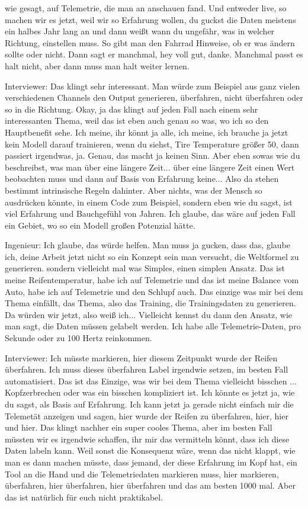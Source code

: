 wie gesagt, auf Telemetrie, die man an anschauen fand. Und entweder live, so machen wir es jetzt, weil wir so Erfahrung wollen, du guckst die Daten meistens ein halbes Jahr lang an und dann weißt wann du ungefähr, was in welcher Richtung, einstellen muss.   So gibt man den Fahrrad Hinweise, ob er was ändern sollte oder nicht. Dann sagt er manchmal, hey voll gut, danke.  Manchmal passt es halt nicht, aber dann muss man halt weiter lernen.

Interviewer: 
Das klingt sehr interessant. Man würde zum Beispiel aus ganz vielen verschiedenen Channels den Output generieren, überfahren, nicht überfahren oder so in die Richtung.  Okay, ja das klingt auf jeden Fall nach einem sehr interessanten Thema, weil das ist eben auch genau so was, wo ich so den Hauptbenefit sehe. Ich meine, ihr könnt ja alle, ich meine, ich brauche ja jetzt kein Modell darauf trainieren, wenn du siehst, Tire Temperature größer 50,  dann passiert irgendwas, ja. Genau,  das macht ja keinen Sinn. Aber eben sowas wie du beschreibst,  was man über eine längere Zeit... über eine längere Zeit einen Wert beobachten muss und dann auf Basis von Erfahrung keine... Also da  stehen bestimmt intrinsische Regeln dahinter. Aber nichts, was der Mensch so ausdrücken könnte, in einem Code zum Beispiel, sondern eben wie du sagst, ist viel Erfahrung und Bauchgefühl  von Jahren. Ich glaube, das wäre auf jeden Fall ein Gebiet, wo so ein Modell großen Potenzial hätte.  


Ingenieur: 
Ich glaube, das würde helfen. Man muss ja gucken, dass das, glaube ich, deine Arbeit jetzt nicht so ein Konzept sein man versucht, die Weltformel zu generieren. sondern vielleicht mal was Simples, einen simplen Ansatz. 
Das ist meine Reifentemperatur, habe ich auf Telemetrie und das ist meine Balance vom Auto, habe ich auf Telemetrie und den Schlupf auch. Das einzige was mir bei dem Thema einfällt, das Thema, also das Training, die Trainingsdaten zu generieren. Da würden wir jetzt, also weiß ich... Vielleicht kennst du dann den Ansatz, wie man sagt, die Daten müssen gelabelt werden. Ich habe alle Telemetrie-Daten,  pro Sekunde oder zu 100 Hertz reinkommen.  


Interviewer: 
Ich müsste markieren, hier diesem Zeitpunkt wurde der Reifen überfahren. Ich muss dieses überfahren Label irgendwie setzen, im besten Fall automatisiert. Das ist das Einzige, was wir bei dem Thema vielleicht bisschen ...  Kopfzerbrechen oder was ein bisschen kompliziert ist.  Ich könnte es jetzt ja, wie du sagst, als Basis auf Erfahrung. Ich kann jetzt ja gerade nicht einfach mir die Telemetät anzeigen und sagen, hier wurde der Reifen zu überfahren, hier, hier und hier.  Das klingt nachher ein super cooles Thema, aber im besten Fall müssten wir es irgendwie schaffen, ihr mir das vermitteln könnt, dass ich diese Daten labeln kann. Weil sonst die Konsequenz wäre, wenn das nicht klappt, wie man es dann machen müsste, dass jemand, der diese Erfahrung im Kopf hat, ein Tool an die Hand und die Telemetriedaten markieren muss, hier markieren, überfahren, hier überfahren, hier überfahren und das am besten 1000 mal. Aber das ist natürlich für euch nicht praktikabel.   


